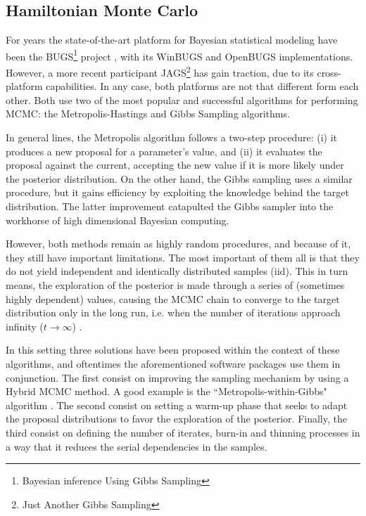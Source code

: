 \subsection{Hamiltonian Monte Carlo}

For years the state-of-the-art platform for Bayesian statistical modeling have been the BUGS\footnote{Bayesian inference Using Gibbs Sampling} project \cite{Lunn_et_al_2000, Lunn_et_al_2009}, with its WinBUGS and OpenBUGS implementations. However, a more recent participant JAGS\footnote{Just Another Gibbs Sampling} \cite{Plummer_2003} has gain traction, due to its cross-platform capabilities. In any case, both platforms are not that different form each other. Both use two of the most popular and successful algorithms for performing MCMC: the Metropolis-Hastings \cite{Metropolis_et_al_1953, Hastings_1970} and Gibbs Sampling \cite{Geman_et_al_1984} algorithms.

In general lines, the Metropolis algorithm follows a two-step procedure: (i) it produces a new proposal for a parameter's value, and (ii) it evaluates the proposal against the current, accepting the new value if it is more likely under the posterior distribution. On the other hand, the Gibbs sampling uses a similar procedure, but it gains efficiency by exploiting the knowledge behind the target distribution. The latter improvement catapulted the Gibbs sampler into the workhorse of high dimensional Bayesian computing. 

However, both methods remain as highly random procedures, and because of it, they still have important limitations. The most important of them all is that they do not yield independent and identically distributed samples (iid). This in turn means, the exploration of the posterior is made through a series of (sometimes highly dependent) values, causing the MCMC chain to converge to the target distribution only in the long run, i.e. when the number of iterations approach infinity ($t \rightarrow \infty$) \cite{Gelman_et_al_2014}. 

In this setting three solutions have been proposed within the context of these algorithms, and oftentimes the aforementioned software packages use them in conjunction. The first consist on improving the sampling mechanism by using a Hybrid MCMC method. A good example is the ``Metropolis-within-Gibbs" algorithm \cite{Muller_1991}. The second consist on setting a warm-up phase that seeks to adapt the proposal distributions to favor the exploration of the posterior. Finally, the third consist on defining the number of iterates, burn-in and thinning processes in a way that it reduces the serial dependencies in the samples. 

